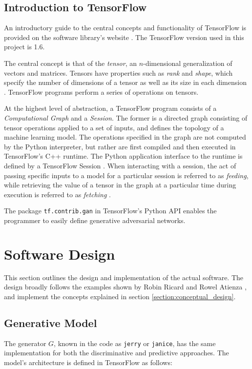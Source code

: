 \documentclass[12pt, titlepage]{report}
\theoremstyle{definition}
\begin{document}
\subsection{Introduction to TensorFlow}
An introductory guide to the central concepts and functionality of TensorFlow is provided on the software library's website \cite{tensorflow2018intro}. The TensorFlow version used in this project is 1.6.

The central concept is that of the \textit{tensor}, an $n$-dimensional generalization of vectors and matrices. Tensors have properties such as \textit{rank} and \textit{shape}, which specify the number of dimensions of a tensor as well as its size in each dimension \cite{tensorflow2018intro}. TensorFlow programs perform a series of operations on tensors.

At the highest level of abstraction, a TensorFlow program consists of a \textit{Computational Graph} and a \textit{Session}. The former is a directed graph consisting of tensor operations applied to a set of inputs, and defines the topology of a machine learning model. The operations specified in the graph are not computed by the Python interpreter, but rather are first compiled and then executed in TensorFlow's C++ runtime. The Python application interface to the runtime is defined by a TensorFlow Session \cite{tensorflow2018graphs}. When interacting with a session, the act of passing specific inputs to a model for a particular session is referred to as \textit{feeding}, while retrieving the value of a tensor in the graph at a particular time during execution is referred to as \textit{fetching} \cite{tensorflow2018intro}.

The package \texttt{tf.contrib.gan} in TensorFlow's Python API enables the programmer to easily define generative adversarial networks.


\section{Software Design}
This section outlines the design and implementation of the actual software. The design broadly follows the examples shown by Robin Ricard \cite{ricard2017generative} and Rowel Atienza \cite{atienza2017gan}, and implement the concepts explained in section \ref{section:conceptual_design}.



\subsection{Generative Model}
The generator $G$, known in the code as \texttt{jerry} or \texttt{janice}, has the same implementation for both the discriminative and predictive approaches. The model's architecture is defined in TensorFlow as follows:
\end{document}
